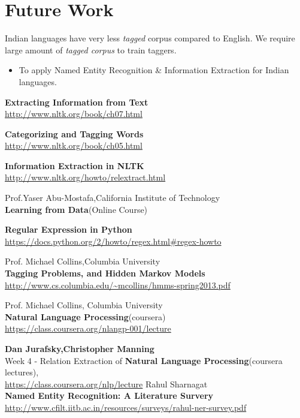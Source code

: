 \documentclass[12pt]{report}
\begin{document}
\section{Future Work}
\par Indian languages have very less \textit{tagged} corpus compared to English. We require
large amount of \textit{tagged corpus} to train taggers.
\begin{itemize}
\item To apply Named Entity Recognition \& Information Extraction for Indian languages.
\end{itemize}

\begin{thebibliography}{99}
\textbf{Extracting Information from Text}\\
\url{http://www.nltk.org/book/ch07.html}

\textbf{Categorizing and Tagging Words}\\
\url{http://www.nltk.org/book/ch05.html}

\textbf{Information Extraction in NLTK}\\
\url{http://www.nltk.org/howto/relextract.html}

Prof.Yaser Abu-Mostafa,California Institute of Technology\\
\textbf{Learning from Data}(Online Course)

\textbf{Regular Expression in Python}\\
\url{https://docs.python.org/2/howto/regex.html#regex-howto}

Prof. Michael Collins,Columbia University\\
\textbf{Tagging Problems, and Hidden Markov Models}\\
\url{http://www.cs.columbia.edu/~mcollins/hmms-spring2013.pdf}

Prof. Michael Collins, Columbia University\\
\textbf{Natural Language Processing}(coursera)\\
\url{https://class.coursera.org/nlangp-001/lecture}

\textbf{Dan Jurafsky,Christopher Manning}\\
Week 4 - Relation Extraction of \textbf{Natural Language Processing}(coursera lectures),\\
\url{https://class.coursera.org/nlp/lecture}
Rahul Sharnagat\\
\textbf{Named Entity Recognition: A Literature Survery}\\
\url{http://www.cfilt.iitb.ac.in/resources/surveys/rahul-ner-survey.pdf}
\end{thebibliography}
\end{document}
